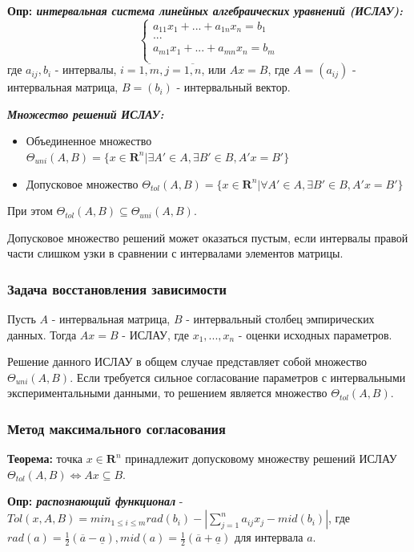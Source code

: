 \documentclass[12pt,a4paper]{article}
\begin{document}
\textbf{Опр: \textit{интервальная система линейных алгебраических уравнений (ИСЛАУ):}}
\begin{equation}
    \left\{
    \begin{array}{ll}
        a_{11}x_1+...+a_{1n}x_n=b_1\\
        ...\\
        a_{m1}x_1+...+a_{mn}x_n=b_m\\
    \end{array}
    \right.
\end{equation}
где $a_{ij},b_i$ - интервалы, $i=\overline{1,m},j=\overline{1,n}$, или $Ax=B$, где $A=(a_{ij})$ - интервальная матрица, $B=(b_i)$ - интервальный вектор.

\textbf{\textit{Множество решений ИСЛАУ:}}
\begin{itemize}
    \item Объединенное множество $\Theta_{uni}(A,B)=\{x\in{\mathbf{R}^n}|\exists{A'}\in{A},\exists{B'}\in{B},A'x=B'\}$
    \item Допусковое множество $\Theta_{tol}(A,B)=\{x\in{\mathbf{R}^n}|\forall{A'}\in{A},\exists{B'}\in{B},A'x=B'\}$
\end{itemize}
При этом $\Theta_{tol}(A,B)\subseteq{\Theta_{uni}(A,B)}$.

Допусковое множество решений может оказаться пустым, если интервалы правой части слишком узки в сравнении с интервалами элементов матрицы.

\subsubsection{Задача восстановления зависимости}
Пусть $A$ - интервальная матрица, $B$ - интервальный столбец эмпирических данных. Тогда $Ax=B$ - ИСЛАУ, где $x_1,...,x_n$ - оценки исходных параметров.

Решение данного ИСЛАУ в общем случае представляет собой множество $\Theta_{uni}(A,B)$. Если требуется сильное согласование параметров с интервальными экспериментальными данными, то решением является множество $\Theta_{tol}(A,B)$.

\subsubsection{Метод максимального согласования}
\textbf{Теорема:} точка $x\in{\mathbf{R}^n}$ принадлежит допусковому множеству решений ИСЛАУ $\Theta_{tol}(A,B)\Longleftrightarrow{Ax\subseteq{B}}$.

\textbf{Опр: \textit{распознающий функционал}} - $Tol(x,A,B)=min_{1\leq{i}\leq{m}}{rad(b_i)}-|\sum_{j=1}^na_{ij}x_j-mid(b_i)|$, где $rad(a)=\frac{1}{2}(\overline{a}-\underline{a}),mid(a)=\frac{1}{2}(\overline{a}+\underline{a})$ для интервала $a$.
\end{document}
